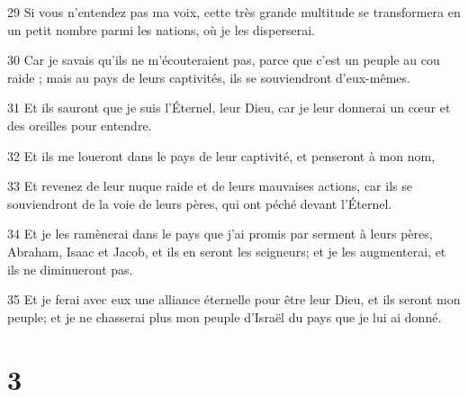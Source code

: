 \par 29 Si vous n'entendez pas ma voix, cette très grande multitude se transformera en un petit nombre parmi les nations, où je les disperserai.
\par 30 Car je savais qu'ils ne m'écouteraient pas, parce que c'est un peuple au cou raide ; mais au pays de leurs captivités, ils se souviendront d'eux-mêmes.
\par 31 Et ils sauront que je suis l'Éternel, leur Dieu, car je leur donnerai un cœur et des oreilles pour entendre.
\par 32 Et ils me loueront dans le pays de leur captivité, et penseront à mon nom,
\par 33 Et revenez de leur nuque raide et de leurs mauvaises actions, car ils se souviendront de la voie de leurs pères, qui ont péché devant l'Éternel.
\par 34 Et je les ramènerai dans le pays que j'ai promis par serment à leurs pères, Abraham, Isaac et Jacob, et ils en seront les seigneurs; et je les augmenterai, et ils ne diminueront pas.
\par 35 Et je ferai avec eux une alliance éternelle pour être leur Dieu, et ils seront mon peuple; et je ne chasserai plus mon peuple d'Israël du pays que je lui ai donné.

\chapter{3}

